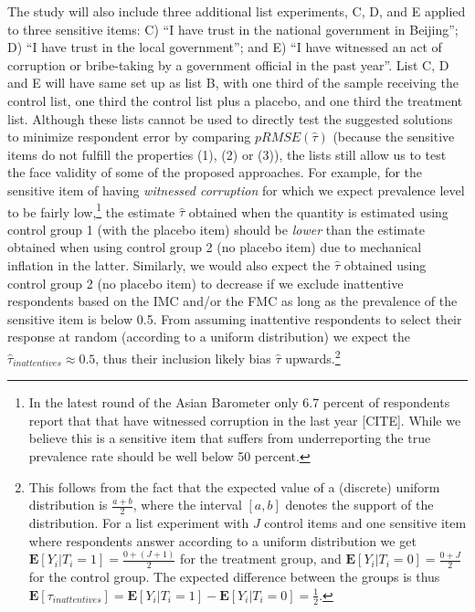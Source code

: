 \documentclass[]{article}
\let\rmarkdownfootnote\footnote%
\def\footnote{\protect\rmarkdownfootnote}
\begin{document}
The study will also include three additional list experiments, C, D, and
E applied to three sensitive items: C) ``I have trust in the national
government in Beijing''; D) ``I have trust in the local government'';
and E) ``I have witnessed an act of corruption or bribe-taking by a
government official in the past year''. List C, D and E will have same
set up as list B, with one third of the sample receiving the control
list, one third the control list plus a placebo, and one third the
treatment list. Although these lists cannot be used to directly test the
suggested solutions to minimize respondent error by comparing
\(pRMSE(\hat{\tau})\) (because the sensitive items do not fulfill the
properties (1), (2) or (3)), the lists still allow us to test the face
validity of some of the proposed approaches. For example, for the
sensitive item of having \emph{witnessed corruption} for which we expect
prevalence level to be fairly low,\footnote{In the latest round of the
  Asian Barometer only 6.7 percent of respondents report that that have
  witnessed corruption in the last year {[}CITE{]}. While we believe
  this is a sensitive item that suffers from underreporting the true
  prevalence rate should be well below 50 percent.} the estimate
\(\hat{\tau}\) obtained when the quantity is estimated using control
group 1 (with the placebo item) should be \emph{lower} than the estimate
obtained when using control group 2 (no placebo item) due to mechanical
inflation in the latter. Similarly, we would also expect the
\(\hat{\tau}\) obtained using control group 2 (no placebo item) to
decrease if we exclude inattentive respondents based on the IMC and/or
the FMC as long as the prevalence of the sensitive item is below 0.5.
From assuming inattentive respondents to select their response at random
(according to a uniform distribution) we expect the
\(\hat{\tau}_{inattentives} \approx 0.5\), thus their inclusion likely
bias \(\hat{\tau}\) upwards.\footnote{This follows from the fact that
  the expected value of a (discrete) uniform distribution is
  \(\frac{a+b}{2}\), where the interval \([a,b]\) denotes the support of
  the distribution. For a list experiment with \(J\) control items and
  one sensitive item where respondents answer according to a uniform
  distribution we get
  \(\mathbf{E}[Y_{i}|T_{i}=1] = \frac{0 + (J+1)}{2}\) for the treatment
  group, and \(\mathbf{E}[Y_{i}|T_{i}=0] = \frac{0 + J}{2}\) for the
  control group. The expected difference between the groups is thus
  \(\mathbf{E}[\tau_{inattentives}] = \mathbf{E}[Y_{i}|T_{i}=1] - \mathbf{E}[Y_{i}|T_{i}=0] = \frac{1}{2}\).}
\end{document}
